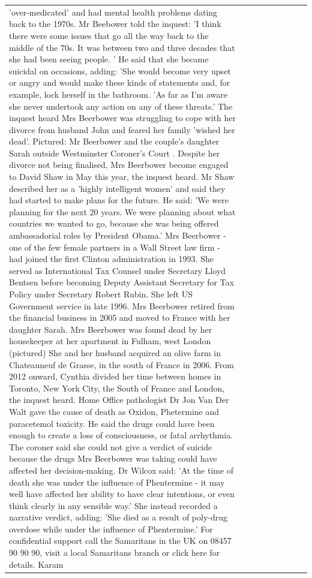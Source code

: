 \begin{table}[H]
\begin{tabular}{lllrlllll}
'over-medicated' and had mental health problems dating back to the 1970s. Mr Beebower told the inquest: 'I think there were some issues that go all the way back to the middle of the 70s. It was between two and three decades that she had been seeing people. ' He said that she became suicidal on occasions, adding: 'She would become very upset or angry and would make these kinds of statements and, for example, lock herself in the bathroom. 'As far as I'm aware she never undertook any action on any of these threats.' The inquest heard Mrs Beerbower was struggling to cope with her divorce from husband John and feared her family 'wished her dead'. Pictured: Mr Beerbower and the couple's daughter Sarah outside Westminster Coroner's Court . Despite her divorce not being finalised, Mrs Beerbower become engaged to David Shaw in May this year, the inquest heard. Mr Shaw described her as a 'highly intelligent women' and said they had started to make plans for the future. He said: 'We were planning for the next 20 years. We were planning about what countries we wanted to go, because she was being offered ambassadorial roles by President Obama.' Mrs Beerbower - one of the few female partners in a Wall Street law firm - had joined the first Clinton administration in 1993. She served as International Tax Counsel under Secretary Lloyd Bentsen before becoming Deputy Assistant Secretary for Tax Policy under Secretary Robert Rubin. She left US Government service in late 1996. Mrs Beerbower retired from the financial business in 2005 and moved to France with her daughter Sarah. Mrs Beerbower was found dead by her housekeeper at her apartment in Fulham, west London (pictured) She and her husband acquired an olive farm in Chateauneuf de Grasse, in the south of France in 2006. From 2012 onward, Cynthia divided her time between homes in Toronto, New York City, the South of France and London, the inquest heard. Home Office pathologist Dr Jon Van Der Walt gave the cause of death as Oxidon, Phetermine and paracetemol toxicity. He said the drugs could have been enough to create a loss of consciousness, or fatal arrhythmia. The coroner said she could not give a verdict of suicide because the drugs Mrs Beerbower was taking could have affected her decision-making. Dr Wilcox said: 'At the time of death she was under the influence of Phentermine - it may well have affected her ability to have clear intentions, or even think clearly in any sensible way.' She instead recorded a narrative verdict, adding: 'She died as a result of poly-drug overdose while under the influence of Phentermine.' For confidential support call the Samaritans in the UK on 08457 90 90 90, visit a local Samaritans branch or click here for details. Karam \\

\end{tabular}
\end{table}
